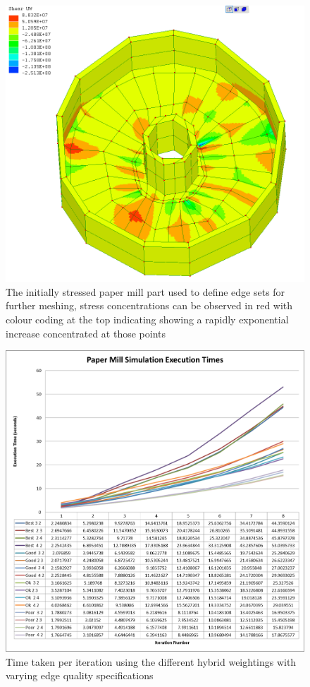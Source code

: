  \begin{figure}[H]
  \centerline{\includegraphics[width=120mm, scale=0.5]{../Graphics/PaperMillStress/PaperMillFirstUWMesh.png}}
  \caption{The initially stressed paper mill part used to define edge sets for further meshing, stress concentrations can be observed in red with colour coding at the top indicating showing a rapidly exponential increase concentrated at those points}
\end{figure}


\begin{figure}[H]
  \centerline{\includegraphics[width=120mm, scale=0.5]{../Graphics/Graphs/PaperMillExecutionTimes.png}}
  \caption{Time taken per iteration using the different hybrid weightings with varying edge quality specifications}
\end{figure}

